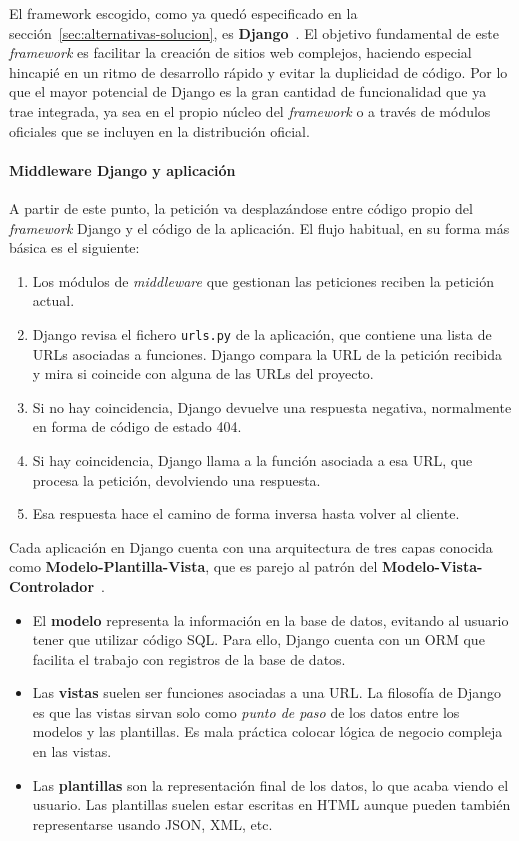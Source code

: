 El framework escogido, como ya quedó especificado en la
sección~\ref{sec:alternativas-solucion}, es \textbf{Django}~\cite{django:mvc}. El
objetivo fundamental de este \textit{framework} es facilitar la creación de
sitios web complejos, haciendo especial hincapié en un ritmo de desarrollo
rápido y evitar la duplicidad de código. Por lo que el mayor potencial de Django
es la gran cantidad de funcionalidad que ya trae integrada, ya sea en el propio
núcleo del \textit{framework} o a través de módulos oficiales que se incluyen en
la distribución oficial.


\paragraph{Middleware Django y aplicación}

A partir de este punto, la petición va desplazándose entre código propio del
\textit{framework} Django y el código de la aplicación. El flujo habitual, en su
forma más básica es el siguiente:

\begin{enumerate}
\item Los módulos de \textit{middleware} que gestionan las peticiones reciben la
  petición actual.
\item Django revisa el fichero \texttt{urls.py} de la aplicación, que contiene
  una lista de URLs asociadas a funciones. Django compara la URL de la petición
  recibida y mira si coincide con alguna de las URLs del proyecto.
\item Si no hay coincidencia, Django devuelve una respuesta negativa,
  normalmente en forma de código de estado 404.
\item Si hay coincidencia, Django llama a la función asociada a esa URL, que
  procesa la petición, devolviendo una respuesta.
\item Esa respuesta hace el camino de forma inversa hasta volver al cliente.
\end{enumerate}

Cada aplicación en Django cuenta con una arquitectura de tres capas conocida
como \textbf{Modelo-Plantilla-Vista}, que es parejo al patrón del
\textbf{Modelo-Vista-Controlador}~\cite{django:mvc}.

\begin{itemize}
\item El \textbf{modelo} representa la información en la base de datos, evitando
  al usuario tener que utilizar código SQL. Para ello, Django cuenta con un
  \ac{ORM} que facilita el trabajo con registros de la base de datos.
\item Las \textbf{vistas} suelen ser funciones asociadas a una URL. La filosofía
  de Django es que las vistas sirvan solo como \textit{punto de paso} de los
  datos entre los modelos y las plantillas. Es mala práctica colocar lógica de
  negocio compleja en las vistas.
\item Las \textbf{plantillas} son la representación final de los datos, lo que
  acaba viendo el usuario. Las plantillas suelen estar escritas en HTML aunque
  pueden también representarse usando JSON, XML, etc.
\end{itemize}

